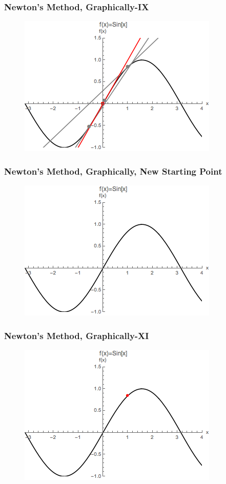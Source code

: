 \documentclass{beamer}
\begin{document}
\begin{frame}
\frametitle[alignment=center]{Newton's Method, Graphically-IX}
\begin{figure}[htdb!]
\centering
\includegraphics[scale=0.8]{Newton_9.png}
\end{figure}
\end{frame}

\begin{frame}
\frametitle[alignment=center]{Newton's Method, Graphically, New Starting Point}
\begin{figure}[htdb!]
\centering
\includegraphics[scale=0.8]{Newton_10.png}
\end{figure}
\end{frame}

\begin{frame}
\frametitle[alignment=center]{Newton's Method, Graphically-XI}
\begin{figure}[htdb!]
\centering
\includegraphics[scale=0.8]{Newton_11.png}
\end{figure}
\end{frame}
\end{document}
